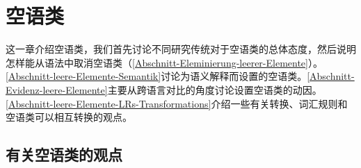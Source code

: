 
\chapter{空语类}
\label{Abschnitt-Diskussion-leere-Elemente}
\label{chap-empty}

这一章介绍空语类，我们首先讨论不同研究传统对于空语类的总体态度，然后说明怎样能从语法中取消空语类（\ref{Abschnitt-Eleminierung-leerer-Elemente}）。\ref{Abschnitt-leere-Elemente-Semantik}讨论为语义解释而设置的空语类。\ref{Abschnitt-Evidenz-leere-Elemente}主要从跨语言对比的角度讨论设置空语类的动因。\ref{Abschnitt-leere-Elemente-LRs-Transformations}介绍一些有关转换、词汇规则和空语类可以相互转换的观点。

\section{有关空语类的观点}

